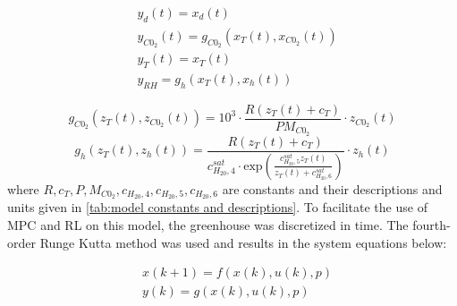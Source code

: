\begin{equation}
	\begin{aligned}
		& y_d(t) = x_d(t) 
		\\
		& y_{C0_2}(t) = g_{C0_2}(x_T(t),x_{C0_2}(t))
		\\
		& y_T (t) = x_T(t)
		\\
		& y_{RH} = g_h (x_T(t),x_h(t))
	\end{aligned}
\end{equation}

\begin{equation}
	g_{C0_2}(z_T(t),z_{C0_2}(t)) = 10^3 \cdot \frac{R(z_T(t) + c_T)}{PM_{C0_2}} \cdot z_{C0_2}(t)
\end{equation}
\begin{equation}
	g_h (z_T(t),z_h(t)) = \frac{R(z_T(t) + c_T)}{c_{H_20,4}^{sat}\cdot \text{exp}(\frac{c_{H_20,5}^{sat}z_T(t)}{z_T(t) + c_{H_20,6}^{sat}})} \cdot z_{h}(t)
\end{equation}
where $R,c_T,P,M_{C0_2},c_{H_20,4},c_{H_20,5},c_{H_20,6}$ are constants and their descriptions and units given in \autoref{tab:model constants and descriptions}. To facilitate the use of MPC and RL on this model, the greenhouse was discretized in time. The fourth-order Runge Kutta method was used and results in the system equations below:

\begin{equation}\label{eq:greenhouse_model_discrete}
	\begin{aligned}
		& x(k+1) = f(x(k),u(k),p) \\
		& y(k) = g(x(k),u(k),p)
	\end{aligned}
\end{equation}

